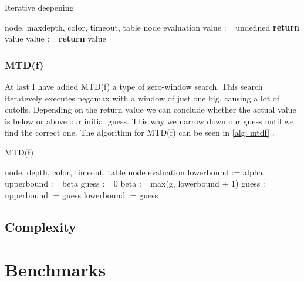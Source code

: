 \documentclass[a4paper]{article}
\begin{document}
\begin{algorithm}
	\caption{Iterative deepening}
	\label{alg: iterative deepening}
	\begin{algorithmic}[1]
		\Require node, maxdepth, color, timeout, table
		\Ensure node evaluation
			\State value := undefined
					\State \textbf{return} value
				\EndIf
				\State value := 
					\State \textbf{return} value
				\EndIf
			\EndFor
		\EndFunction
	\end{algorithmic}
\end{algorithm}

\subsubsection*{MTD(f)}
At last I have added MTD(f) a type of zero-window search. This search
iteratevely executes negamax with a window of just one big, causing a lot of
cutoffs. Depending on the return value we can conclude whether the actual value
is below or above our initial guess. This way we narrow down our guess until we
find the correct one. The algorithm for MTD(f) can be seen in \ref{alg: mtdf}
\cite{wiki:mtdf}.

\begin{algorithm}
	\caption{MTD(f)}
	\label{alg: mtdf}
	\begin{algorithmic}[1]
		\Require node, depth, color, timeout, table
		\Ensure node evaluation
			\State lowerbound := alpha
			\State upperbound := beta
			\State guess := 0
				\State beta := max(g, lowerbound + 1)
				\State guess := 
					\State upperbound := guess
				\Else
					\State lowerbound := guess
				\EndIf
			\EndWhile
		\EndFunction
	\end{algorithmic}
\end{algorithm}

\subsection{Complexity}

\section{Benchmarks}
\end{document}
